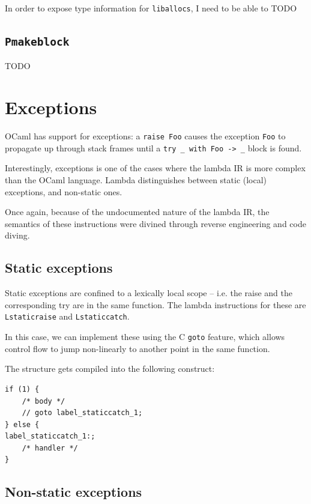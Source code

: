 \documentclass[12pt,a4paper,twoside,openright]{report}
\begin{document}
In order to expose type information for \lstinline!liballocs!, I need to be able
to TODO

\subsection{\texttt{Pmakeblock}}

TODO

\section{Exceptions}\label{exceptions}

OCaml has support for exceptions: a \lstinline!raise Foo! causes the
exception \lstinline!Foo! to propagate up through stack frames until a
\lstinline!try _ with Foo -> _! block is found.

Interestingly, exceptions is one of the cases where the lambda IR is more
complex than the OCaml language. Lambda distinguishes between static (local)
exceptions, and non-static ones.

Once again, because of the undocumented nature of the lambda IR, the semantics
of these instructions were divined through reverse engineering and code diving.

\subsection{Static exceptions}

Static exceptions are confined to a lexically local scope -- i.e. the raise and
the corresponding try are in the same function. The lambda instructions for
these are \lstinline!Lstaticraise! and \lstinline!Lstaticcatch!.

In this case, we can implement these using the C \lstinline!goto! feature,
which allows control flow to jump non-linearly to another point in the same
function.

The structure gets compiled into the following construct:

\begin{lstlisting}
if (1) {
    /* body */
    // goto label_staticcatch_1;
} else {
label_staticcatch_1:;
    /* handler */
}
\end{lstlisting}

\subsection{Non-static exceptions}
\end{document}

